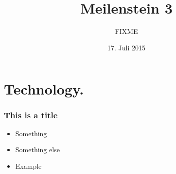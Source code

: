 \documentclass{beamer}
\title{Meilenstein 3}
\author{ FIXME}
\institute{TU Berlin}
\date{17. Juli 2015}
\begin{document}
\frame{\titlepage}

\section{Technology.}
\begin{frame}
    \frametitle{This is a title}
    \begin{itemize}
        \item Something
        \item Something else
        \item Example
    \end{itemize}
\end{frame}
\end{document}
